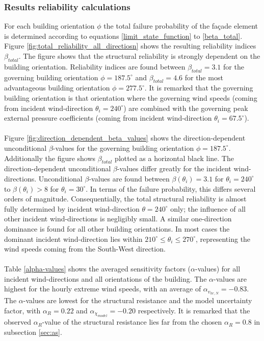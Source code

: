 \subsubsection{Results reliability calculations}
For each building orientation $\phi$ the total failure probability of the fa\c{c}ade element is determined according to equations \ref{limit_state_function} to \ref{beta_total}. Figure \ref{fig:total_reliability_all_directiosn} shows  the resulting reliability indices $\beta_{total}$. The figure shows that the structural reliability is strongly dependent on the building orientation. Reliability indices are found between $\beta_{total}= 3.1$ for the governing building orientation $\phi=187.5^{\circ}$ and $\beta_{total}=4.6$ for the most advantageous building orientation $\phi=277.5^{\circ}$. It is remarked that the governing building orientation is that orientation where the  governing wind speeds (coming from incident wind-direction $\theta_i=240^{\circ}$) are combined with the governing peak external pressure coefficients (coming from incident wind-direction $\theta_i= 67.5^{\circ}$).\\
\\
Figure \ref{fig:direction_dependent_beta_values} shows the direction-dependent unconditional $\beta$-values for the governing building orientation $\phi=187.5^{\circ}$. Additionally the figure shows $\beta_{total}$ plotted as a horizontal black line. The direction-dependent unconditional $\beta$-values differ greatly for the incident wind-directions. Unconditional $\beta$-values are found between $\beta(\theta_i)=3.1$ for $\theta_i=240^{\circ}$ to $\beta(\theta_i)> 8$ for $\theta_i=30^{\circ}$. In terms of the failure probability, this differs several orders of magnitude. Consequentially, the total structural reliability is almost fully determined by incident wind-direction $\theta=240^{\circ}$ only;  the influence of all other incident wind-directions is negligibly small. A similar one-direction dominance is found for all other building orientations. In most cases the dominant incident wind-direction lies within $210^{\circ} \leq\theta_i \leq 270^{\circ}$, representing the wind speeds coming from the South-West direction.\\
\\
Table \ref{alpha-values} shows the averaged sensitivity factors ($\alpha$-values) for all incident wind-directions and all orientations of the building. The $\alpha$-values are highest for the hourly extreme wind speeds, with an average of $\alpha_{v_{hr,N}} = -0.83$. The $\alpha$-values are lowest for the structural resistance and the model uncertainty factor, with $\alpha_R=0.22$ and $\alpha_{\chi_{model}}=-0.20$ respectively. It is remarked that the observed $\alpha_R$-value of the structural resistance lies far from the chosen $\alpha_R=0.8$ in subsection \ref{sec:as}. 





